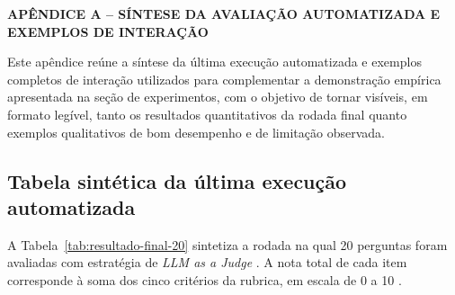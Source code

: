 \appendix
\clearpage
{}
{}
\begin{center}
\textbf{APÊNDICE A -- SÍNTESE DA AVALIAÇÃO AUTOMATIZADA E EXEMPLOS DE INTERAÇÃO}
\end{center}
\label{sec:apendice-exemplos}

Este apêndice reúne a síntese da última execução automatizada e exemplos completos de interação utilizados para complementar a demonstração empírica apresentada na seção de experimentos, com o objetivo de tornar visíveis, em formato legível, tanto os resultados quantitativos da rodada final quanto exemplos qualitativos de bom desempenho e de limitação observada.

\subsection{Tabela sintética da última execução automatizada}

A Tabela~\ref{tab:resultado-final-20} sintetiza a rodada na qual 20 perguntas foram avaliadas com estratégia de \textit{LLM as a Judge} \parencite{liuEtAl2025judgeRag}. A nota total de cada item corresponde à soma dos cinco critérios da rubrica, em escala de 0 a 10 \parencite{liuEtAl2023geval}.

